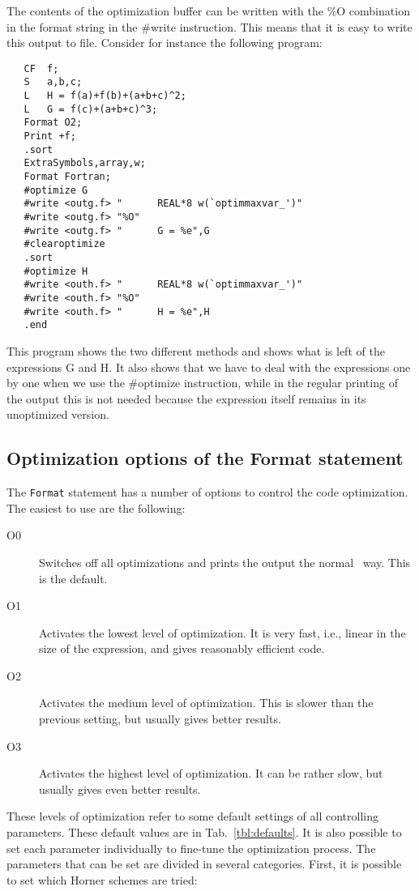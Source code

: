 The contents of the optimization buffer can be 
written with the \%O combination in the format string in the \#write 
instruction. This means that it is easy to write this output to file. 
Consider for instance the following program:
\begin{verbatim}
   CF  f;
   S   a,b,c;
   L   H = f(a)+f(b)+(a+b+c)^2;
   L   G = f(c)+(a+b+c)^3;
   Format O2;
   Print +f;
   .sort
   ExtraSymbols,array,w;
   Format Fortran;
   #optimize G
   #write <outg.f> "      REAL*8 w(`optimmaxvar_')"
   #write <outg.f> "%O"
   #write <outg.f> "      G = %e",G
   #clearoptimize
   .sort
   #optimize H
   #write <outh.f> "      REAL*8 w(`optimmaxvar_')"
   #write <outh.f> "%O"
   #write <outh.f> "      H = %e",H
   .end
\end{verbatim}
This program shows the two different methods and shows what is left of the 
expressions G and H. It also shows that we have to deal with the 
expressions one by one when we use the \#optimize instruction, while in the 
regular printing of the output this is not needed because the expression 
itself remains in its unoptimized version.

\subsection{Optimization options of the Format statement}

The \verb|Format| statement has a number of options to control the
code optimization. The easiest to use are the following:

\begin{description}
\item[O0] Switches off all optimizations and prints the output the
  normal \FORM\ way. This is the default.

\item[O1] Activates the lowest level of optimization. It is very fast,
  i.e., linear in the size of the expression, and gives reasonably
  efficient code.

\item[O2] Activates the medium level of optimization. This is slower
  than the previous setting, but usually gives better results.

\item[O3] Activates the highest level of optimization. It can be
  rather slow, but usually gives even better results.
\end{description}

These levels of optimization refer to some default settings of all
controlling parameters. These default values are in
Tab.~\ref{tbl:defaults}. It is also possible to set each parameter
individually to fine-tune the optimization process. The parameters
that can be set are divided in several categories. First, it is
possible to set which Horner schemes are tried:

